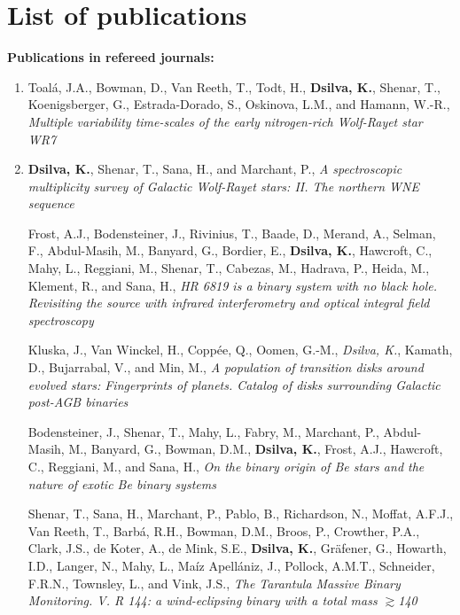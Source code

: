 \chapter{List of publications}\label{ch:publications}

\begin{large}
\textbf{Publications in refereed journals:}
\end{large}

\begin{enumerate}

\item Toalá, J.A., Bowman, D., Van Reeth, T., Todt, H., \textbf{Dsilva, K.}, Shenar, T., Koenigsberger, G., Estrada-Dorado, S., Oskinova, L.M., and Hamann, W.-R., \textit{Multiple variability time-scales of the early nitrogen-rich Wolf-Rayet star WR7}

\item \textbf{Dsilva, K.}, Shenar, T., Sana, H., and Marchant, P., \textit{A spectroscopic multiplicity survey of Galactic Wolf-Rayet stars: II. The northern WNE sequence}

Frost, A.J., Bodensteiner, J., Rivinius, T., Baade, D., Merand, A., Selman, F., Abdul-Masih, M., Banyard, G., Bordier, E., \textbf{Dsilva, K.}, Hawcroft, C., Mahy, L., Reggiani, M., Shenar, T., Cabezas, M., Hadrava, P., Heida, M., Klement, R., and Sana, H., \textit{HR 6819 is a binary system with no black hole. Revisiting the source with infrared interferometry and optical integral field spectroscopy}

Kluska, J., Van Winckel, H., Coppée, Q., Oomen, G.-M., \textit{Dsilva, K.}, Kamath, D., Bujarrabal, V., and Min, M., \textit{A population of transition disks around evolved stars: Fingerprints of planets. Catalog of disks surrounding Galactic post-AGB binaries}

Bodensteiner, J., Shenar, T., Mahy, L., Fabry, M., Marchant, P., Abdul-Masih, M., Banyard, G., Bowman, D.M., \textbf{Dsilva, K.}, Frost, A.J., Hawcroft, C., Reggiani, M., and Sana, H., \textit{On the binary origin of Be stars and the nature of exotic Be binary systems}

Shenar, T., Sana, H., Marchant, P., Pablo, B., Richardson, N., Moffat, A.F.J., Van Reeth, T., Barbá, R.H., Bowman, D.M., Broos, P., Crowther, P.A., Clark, J.S., de Koter, A., de Mink, S.E., \textbf{Dsilva, K.}, Gräfener, G., Howarth, I.D., Langer, N., Mahy, L., Maíz Apellániz, J., Pollock, A.M.T., Schneider, F.R.N., Townsley, L., and Vink, J.S., \textit{The Tarantula Massive Binary Monitoring. V. R 144: a wind-eclipsing binary with a total mass $\gtrsim$140\,\Msun{}}


\end{enumerate}
